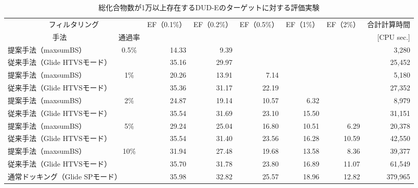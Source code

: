 \begin{landscape}
\begin{table}[p] \centering
	\caption{総化合物数が1万以上存在するDUD-Eのターゲットに対する評価実験}
	\label{table:usecase_accuracy}
	\begin{tabular}{lc|rrrrr|r}
	\hline
	\multicolumn{2}{c|}{フィルタリング}					&\multirow{2}{*}{EF（0.1\%）}	&\multirow{2}{*}{EF（0.2\%）}	&\multirow{2}{*}{EF（0.5\%）}	&\multirow{2}{*}{EF（1\%）}	&\multirow{2}{*}{EF（2\%）}	&合計計算時間	\\
	\multicolumn{1}{c}{手法}	&通過率					&						&						&						&						&						&[CPU sec.]		\\ \hline
	提案手法（maxsumBS）		&\multirow{2}{*}{0.5\%}	&14.33					&9.39					&\textendash				&\textendash				&\textendash				&3,280			\\
	従来手法（Glide HTVSモード）	&					&35.16					&29.97					&\textendash				&\textendash				&\textendash				&25,452			\\
	提案手法（maxsumBS）		&\multirow{2}{*}{1\%}	&20.26					&13.91					&7.14					&\textendash				&\textendash				&5,180			\\
	従来手法（Glide HTVSモード）	&					&35.36					&31.17					&22.19					&\textendash				&\textendash				&27,352			\\
	提案手法（maxsumBS）		&\multirow{2}{*}{2\%}	&24.87					&19.14					&10.57					&6.32					&\textendash				&8,979			\\
	従来手法（Glide HTVSモード）	&					&35.54					&31.69					&23.10					&15.50					&\textendash				&31,151			\\
	提案手法（maxsumBS）		&\multirow{2}{*}{5\%}	&29.24					&25.04					&16.80					&10.51					&6.29					&20,378			\\
	従来手法（Glide HTVSモード）	&					&35.54					&31.40					&23.56					&16.28					&10.59					&42,550			\\
	提案手法（maxsumBS）		&\multirow{2}{*}{10\%}	&31.94					&27.48					&19.68					&13.58					&8.36					&39,377			\\
	従来手法（Glide HTVSモード）	&					&35.70					&31.78					&23.80					&16.89					&11.07					&61,549			\\ \hline
	\multicolumn{2}{l|}{通常ドッキング（Glide SPモード）}	&35.98					&32.82					&25.57					&18.96					&12.82					&379,965			\\ \hline
	\end{tabular}
\end{table}
\end{landscape}

